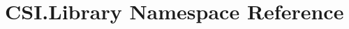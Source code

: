 \hypertarget{namespace_c_s_i_1_1_library}{}\section{C\+S\+I.\+Library Namespace Reference}
\label{namespace_c_s_i_1_1_library}
